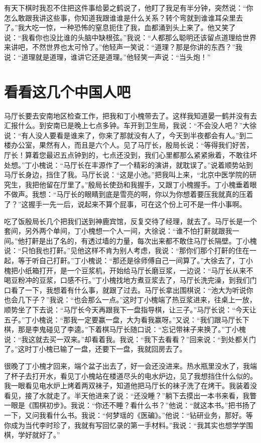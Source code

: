 \documentclass[12pt,oneside]{book}
\begin{document}
有天下棋时我忍不住把这件事给晏之鹤说了，他盯了我足有半分钟，突然说：``你怎么敢跟我讲这些事，你知道我跟谁谁是什么关系？转个弯就到谁谁耳朵里去了。''我大吃一惊，一种恐怖的窒息扼住了我，血都涌到头上来了。他又笑了说：``我看你也没比谁的头脑中缺根弦。''我说：``人都那么聪明还该留点道理给世界来讲吧，不然世界也太可怜了。''他轻声一笑说：``道理？那是你讲的东西？''我说：``道理就是道理，谁讲它还是道理。''他轻笑一声说：``当头炮！''


\chapter{看看这几个中国人吧}
马厅长要去安南地区检查工作，把我和丁小槐带去了。这样我知道晏一鹤并没有去汇报什么。到安南已是晚上七点多钟。车开到卫生局，我说：``不会没人吧？''大徐说：``有人没人要看是谁来了，你来了那就没有人了，今天到半夜都会有人。''到二楼办公室，果然有人，而且是六个人。见了马厅长，殷局长说：``等得我们好苦，厅长！算着您最迟五点钟到的，七点还没到，我们心里都那么紧紧揪着，不敢往坏处想。''丁小槐说：``马厅长在丰源作了一个精彩的演讲，就耽误了。''说着顺势站到马厅长身边，挡住了我。马厅长说：``这是小池。''把我叫上来，``北京中医学院的研究生，我把他留在厅里了。''殷局长使劲和我握手，又跟丁小槐握手。丁小槐垂着眼不做声。我想：``马厅长的眼睛到底是雪亮的啊，你以为你想着要压我就真的压着了？''这握手一先一后，说起来不算个屁事，可在这个份上可不是一件小事啊。

吃了饭殷局长几个把我们送到神鹿宾馆，反复交待了经理，就去了。马厅长是一个套间，另外两个单间，丁小槐想一个人一间，大徐说：``谁不怕打鼾就跟我一间。''他打鼾是出了名的，有透过墙的力量，每次出来都不敢住马厅长隔壁。丁小槐说：``只怕我也打鼾。''见他这样不肯为别人考虑，我说：``那你们那个打鼾的住在一起，等于听自己打鼾。''丁小槐说：``那还是徐师傅自己一间算了。''大徐去了，丁小槐把小纸箱打开，是一个豆浆机，开始给马厅长磨豆浆，一边说：``马厅长从来不喝豆粉冲的豆浆，口感不行。''丁小槐找地方煮豆浆去了，马厅长洗完澡，到我们门口看了一下，我想着有什么事，就跟了过去。马厅长拿出围棋说：``池大为听说你也会几下子？''我说：``也会那么一点。''这时丁小槐端了热豆浆进来，往桌上一放，顺势坐了下去说：``马厅长今天再跟我下一盘指导棋，让三子。''马厅长说：``今天让五子。''丁小槐说：``那我一定要赢一盘，大为看我赢呀。''又说：``我们跟马厅长下棋，那是李鬼碰见了李逵。''下着棋马厅长随口说：``忘记带袜子来换了。''丁小槐说：``我这就去买一双来。''却看着我。我说：``我下去看看？''回来说：``到处都关门了。''这时丁小槐已输了一盘，还要下一盘，我就回房去了。

很晚了丁小槐才回来，端个盆子出去了，好一会还没进来。热水瓶里没水了，我端了杯子去打开水，看见丁小槐站在楼道尽头的电水炉边，见了我想挡住什么似的。我一眼看见电水炉上烤着两双袜子，知道他把马厅长的袜子洗了在烤干。我装着没看见，接了水就走了。半天他进来了说：``还没睡？''躺下去摸出一本书来看，我瞥一眼是《围棋初步》。我说：``你还不睡？看什么书？''他说：``就这本书。''把书扬了一下，又问我看什么书。我说：``何梦瑶的《医碥》。''他说：``钻研业务，那好。等你成为当代李时珍了，我就有写回忆录的第一手材料。''我说：``我其实也想学学围棋，学好就好了。''
\end{document}
